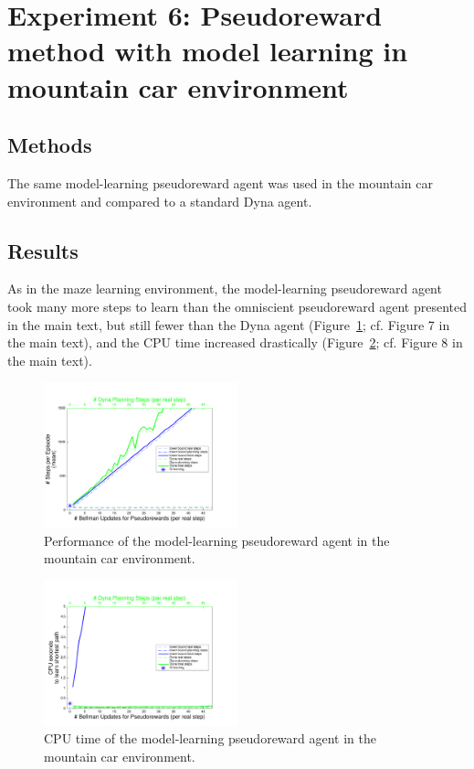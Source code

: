 \documentclass[letterpaper]{article}
\begin{document}
\section{Experiment 6: Pseudoreward method with model learning in mountain car environment}

\subsection{Methods}

The same model-learning pseudoreward agent was used in the mountain car environment and compared to a standard Dyna agent.

\subsection{Results}

As in the maze learning environment, the model-learning pseudoreward agent took many more steps to learn than the omniscient pseudoreward agent presented in the main text, but still fewer than the Dyna agent (Figure~\ref{fig:S4a}; cf. Figure 7 in the main text), and the CPU time increased drastically (Figure~\ref{fig:S4b}; cf. Figure 8 in the main text).

\begin{figure}[ht]
\centering
\includegraphics[width=0.5\textwidth]{MC_learning_vs_PRiterationsLearnMod_DYNA_mean}
\caption{Performance of the model-learning pseudoreward agent in the mountain car environment.}
\label{fig:S4a}
\end{figure}

\begin{figure}[ht]
\centering
\includegraphics[width=0.5\textwidth]{MC_cpus_vs_PRiterationsLearnMod_DYNA_toGoal}
\caption{CPU time of the model-learning pseudoreward agent in the mountain car environment.}
\label{fig:S4b}
\end{figure}
\end{document}
